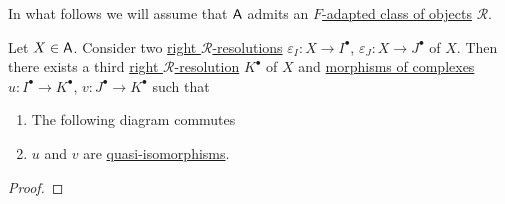 \documentclass[../../../main]{subfiles}
\begin{document}
In what follows we will assume that \(\mathsf{A}\) admits an \hyperref[def:adapted-class-of-objects]{\(F\)-adapted class of objects} \(\mathcal{R}\).

\begin{lemma}\label{lemma:existence-roof-R-resolutions}
  Let \(X \in \mathsf{A}\).
  Consider two \hyperref[def:right-R-resolution]{right \(\mathcal{R}\)-resolutions} \(\varepsilon_{I}: X \to I^{\bullet}\), \(\varepsilon_{J}: X \to J^{\bullet}\) of \(X\).
  Then there exists a third \hyperref[def:right-R-resolution]{right \(\mathcal{R}\)-resolution} \(K^{\bullet}\) of \(X\) and \hyperref[def:complex-morphism]{morphisms of complexes} \(u: I^{\bullet} \to K^{\bullet}\), \(v: J^{\bullet} \to K^{\bullet}\) such that
  \begin{enumerate}
    \item The following diagram commutes
          \begin{center}
          \end{center}
    \item \(u\) and \(v\) are \hyperref[def:quasi-isomorphism]{quasi-isomorphisms}.
  \end{enumerate}
\end{lemma}
\begin{proof}

\end{proof}
\end{document}
